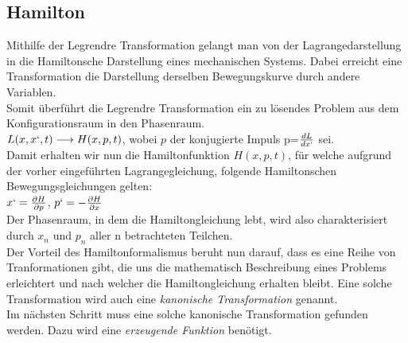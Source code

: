 \documentclass[]{article}
\begin{document}
\subsection{Hamilton}
Mithilfe der Legrendre Transformation gelangt man von der Lagrangedarstellung in die Hamiltonsche Darstellung eines mechanischen Systems. Dabei erreicht eine Transformation die Darstellung derselben Bewegungskurve durch andere Variablen. \\
Somit überführt die Legrendre Transformation ein zu lösendes Problem aus dem Konfigurationsraum in den Phasenraum.
\\
\newline
$L(x,x`,t)\longrightarrow H(x,p,t)$, wobei $p$ der konjugierte Impuls p=$\frac{dL}{dx`}$ sei. 
\newline
\\
Damit erhalten wir nun die Hamiltonfunktion $H(x,p,t)$, für welche aufgrund der vorher eingeführten Lagrangegleichung, folgende Hamiltonschen Bewegungsgleichungen gelten: 
\newline
\\
$x`= \frac{\partial H}{\partial p}$, $p`= -\frac{\partial H}{\partial x}$
\newline
\\
Der Phasenraum, in dem die Hamiltongleichung lebt, wird also charakterisiert durch $x_n$ und $p_n$ aller n betrachteten Teilchen. 
\\
Der Vorteil des Hamiltonformalismus beruht nun darauf, dass es eine Reihe von Tranformationen gibt, die uns die mathematisch Beschreibung eines Problems erleichtert und nach welcher die Hamiltongleichung erhalten bleibt. Eine solche Transformation wird auch eine \textit{kanonische Transformation} genannt.  
\\
\newline
Im nächsten Schritt muss eine solche kanonische Transformation gefunden werden. Dazu wird eine \textit{erzeugende Funktion} benötigt. 
\end{document}
